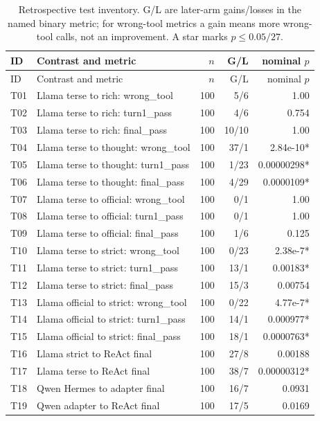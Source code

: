 \begin{center}
\scriptsize
\begin{longtable}{@{}lp{.49\linewidth}rrr@{}}
\caption{Retrospective test inventory. G/L are later-arm gains/losses in the named binary metric;
for wrong-tool metrics a gain means more wrong-tool calls, not an improvement. A star marks
$p\leq0.05/27$.}\label{tab:testfamily}\\
\toprule
ID & Contrast and metric & $n$ & G/L & nominal $p$\\
\midrule
\endfirsthead
\toprule ID & Contrast and metric & $n$ & G/L & nominal $p$\\ \midrule
\endhead
T01 & Llama terse to rich: wrong\_tool & 100 & 5/6 & 1.00 \\
T02 & Llama terse to rich: turn1\_pass & 100 & 4/6 & 0.754 \\
T03 & Llama terse to rich: final\_pass & 100 & 10/10 & 1.00 \\
T04 & Llama terse to thought: wrong\_tool & 100 & 37/1 & 2.84e-10* \\
T05 & Llama terse to thought: turn1\_pass & 100 & 1/23 & 0.00000298* \\
T06 & Llama terse to thought: final\_pass & 100 & 4/29 & 0.0000109* \\
T07 & Llama terse to official: wrong\_tool & 100 & 0/1 & 1.00 \\
T08 & Llama terse to official: turn1\_pass & 100 & 0/1 & 1.00 \\
T09 & Llama terse to official: final\_pass & 100 & 1/6 & 0.125 \\
T10 & Llama terse to strict: wrong\_tool & 100 & 0/23 & 2.38e-7* \\
T11 & Llama terse to strict: turn1\_pass & 100 & 13/1 & 0.00183* \\
T12 & Llama terse to strict: final\_pass & 100 & 15/3 & 0.00754 \\
T13 & Llama official to strict: wrong\_tool & 100 & 0/22 & 4.77e-7* \\
T14 & Llama official to strict: turn1\_pass & 100 & 14/1 & 0.000977* \\
T15 & Llama official to strict: final\_pass & 100 & 18/1 & 0.0000763* \\
T16 & Llama strict to ReAct final & 100 & 27/8 & 0.00188 \\
T17 & Llama terse to ReAct final & 100 & 38/7 & 0.00000312* \\
T18 & Qwen Hermes to adapter final & 100 & 16/7 & 0.0931 \\
T19 & Qwen adapter to ReAct final & 100 & 17/5 & 0.0169 \\

\end{longtable}
\end{center}
